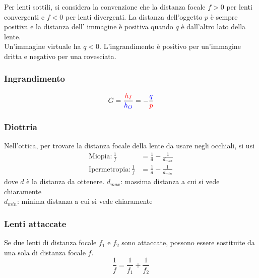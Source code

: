 \begin{center}
\end{center}
Per lenti sottili, si considera la convenzione che la distanza focale $f > 0$ per lenti convergenti
e $f<0$ per lenti divergenti. La distanza dell'oggetto $p$ è sempre positiva e la distanza dell'
immagine è positiva quando $q$ è dall'altro lato della lente.\\
Un'immagine virtuale ha $q < 0$. L'ingrandimento è positivo per un'immagine dritta e negativo per una
rovesciata.

\subsubsection{Ingrandimento}
\begin{equation*}
  G = \frac{\mathcolor{red}{h_I}}{\mathcolor{blue}{h_O}} =
  -\frac{\mathcolor{blue}{q}}{\mathcolor{red}{p}}
\end{equation*}

\subsubsection{Diottria}
Nell'ottica, per trovare la distanza focale della lente da usare negli occhiali, si usi
\begin{align*}
  \text{Miopia:}\,\frac{1}{f}&=\frac{1}{d}-\frac{1}{d_{max}}\\
  \text{Ipermetropia:}\,\frac{1}{f}&=\frac{1}{d}-\frac{1}{d_{min}} 
\end{align*}
dove $d$ è la distanza da ottenere.
$d_{max}$: massima distanza a cui si vede chiaramente\\
$d_{min}$: minima distanza a cui si vede chiaramente

\subsubsection{Lenti attaccate}
Se due lenti di distanza focale $f_1$ e $f_2$ sono attaccate, possono essere sostituite da una sola
di distanza focale $f$.
\begin{equation*}
  \frac{1}{f} = \frac{1}{f_1}+\frac{1}{f_2}
\end{equation*}

